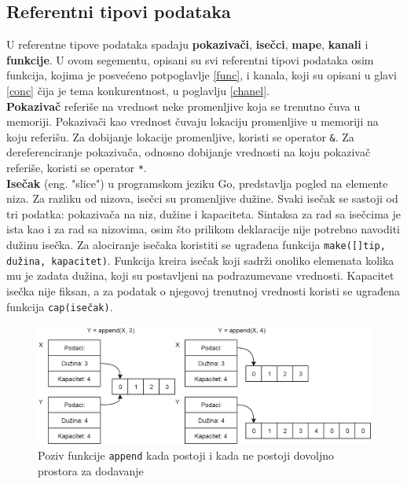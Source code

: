 \documentclass[12pt,oneside]{memoir}
\begin{document}
\subsection{Referentni tipovi podataka}
U referentne tipove podataka spadaju \textbf{pokazivači}, \textbf{isečci}, \textbf{mape}, \textbf{kanali} i \textbf{funkcije}. U ovom segementu, opisani su svi referentni tipovi podataka osim funkcija, kojima je posvećeno potpoglavlje \ref{func}, i kanala, koji su opisani u glavi \ref{conc} čija je tema konkurentnost, u poglavlju \ref{chanel}. 
\\

\textbf{Pokazivač} referiše na vrednost neke promenljive koja se trenutno čuva u memoriji. Pokazivači kao vrednost čuvaju lokaciju promenljive u memoriji na koju referišu. Za dobijanje lokacije promenljive, koristi se operator \texttt{\&}. Za dereferenciranje pokazivača, odnosno dobijanje vrednosti na koju pokazivač referiše, koristi se operator \texttt{*}.
\\

\textbf{Isečak} (eng. "slice") u programskom jeziku Go, predstavlja pogled na elemente niza. Za razliku od nizova, isečci su promenljive dužine. Svaki isečak se sastoji od tri podatka: pokazivača na niz, dužine i kapaciteta. Sintaksa za rad sa isečcima je ista kao i za rad sa nizovima, osim što prilikom deklaracije nije potrebno navoditi dužinu isečka. Za alociranje isečaka koristiti se ugrađena funkcija \texttt{make([]tip, dužina, kapacitet)}. Funkcija kreira isečak koji sadrži onoliko elemenata kolika mu je zadata dužina, koji su postavljeni na podrazumevane vrednosti. Kapacitet isečka nije fiksan, a za podatak o njegovoj trenutnoj vrednosti koristi se ugrađena funkcija \texttt{cap(isečak)}.

\begin{figure}
\begin{center}
\includegraphics[scale=0.33]{slice.png}
\end{center}
\caption{Poziv funkcije \texttt{append} kada postoji i kada ne postoji dovoljno prostora za dodavanje}
\label{fig:slice}
\end{figure}
\end{document}
